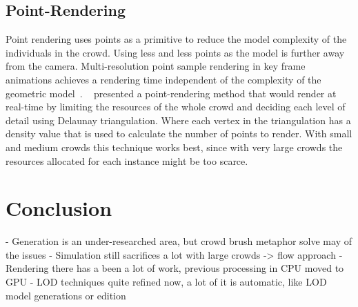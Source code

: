 \documentclass[11pt,twocolumn]{article}
\numberwithin{equation}{section} %
\numberwithin{figure}{section} %
\numberwithin{table}{section} %
\begin{document}
\subsection{Point-Rendering}

Point rendering uses points as a primitive to reduce the model complexity of the individuals in the crowd.
Using less and less points as the model is further away from the camera.
Multi-resolution point sample rendering in key frame animations achieves a rendering time independent of the complexity of the geometric model~\cite{Wand2002}.
~\cite{Larkin2010} presented a point-rendering method that would render at real-time by limiting the resources of the whole crowd and deciding each level of detail using Delaunay triangulation. 
Where each vertex in the triangulation has a density value that is used to calculate the number of points to render.
With small and medium crowds this technique works best, since with very large crowds the resources allocated for each instance might be too scarce.

\section{Conclusion}

- Generation is an under-researched area, but crowd brush metaphor solve may of the issues
- Simulation still sacrifices a lot with large crowds -> flow approach
- Rendering there has a been a lot of work, previous processing in CPU moved to GPU
- LOD techniques quite refined now, a lot of it is automatic, like LOD model generations or edition

%


\end{document}
